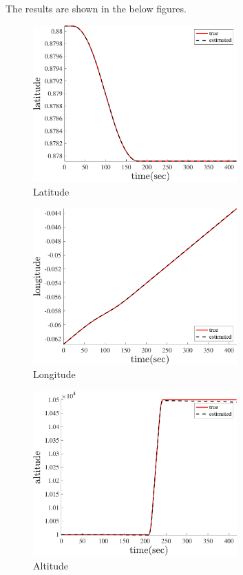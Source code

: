 The results are shown in the below figures.
\begin{figure}[H]
    \centering
    \includegraphics[width=0.7\textwidth]{../Figure/Q5/latitude}
    \caption{Latitude}
\end{figure}
\begin{figure}[H]
    \centering
    \includegraphics[width=0.7\textwidth]{../Figure/Q5/longitude}
    \caption{Longitude}
\end{figure}
\begin{figure}[H]
    \centering
    \includegraphics[width=0.7\textwidth]{../Figure/Q5/altitude}
    \caption{Altitude}
\end{figure}
